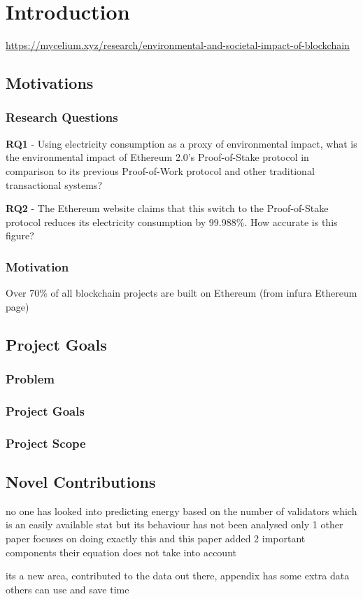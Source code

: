 \chapter{Introduction}
\url{https://mycelium.xyz/research/environmental-and-societal-impact-of-blockchain}
\section{Motivations}

\subsection{Research Questions}

\textbf{RQ1} - Using electricity consumption as a proxy of environmental impact, what is the environmental impact of Ethereum 2.0's Proof-of-Stake protocol in comparison to its previous Proof-of-Work protocol and other traditional transactional systems?

\textbf{RQ2} - The Ethereum website claims that this switch to the Proof-of-Stake protocol reduces its electricity consumption by 99.988\%. How accurate is this figure?

\subsection{Motivation}

Over 70\% of all blockchain projects are built on Ethereum (from infura Ethereum page)


\section{Project Goals}
\subsection{Problem}
\subsection{Project Goals}
\subsection{Project Scope}

\section{Novel Contributions}

no one has looked into predicting energy based on the number of validators which is an easily available stat but its behaviour has not been analysed
only 1 other paper focuses on doing exactly this and this paper added 2 important components their equation does not take into account

its a new area, contributed to the data out there, appendix has some extra data others can use and save time